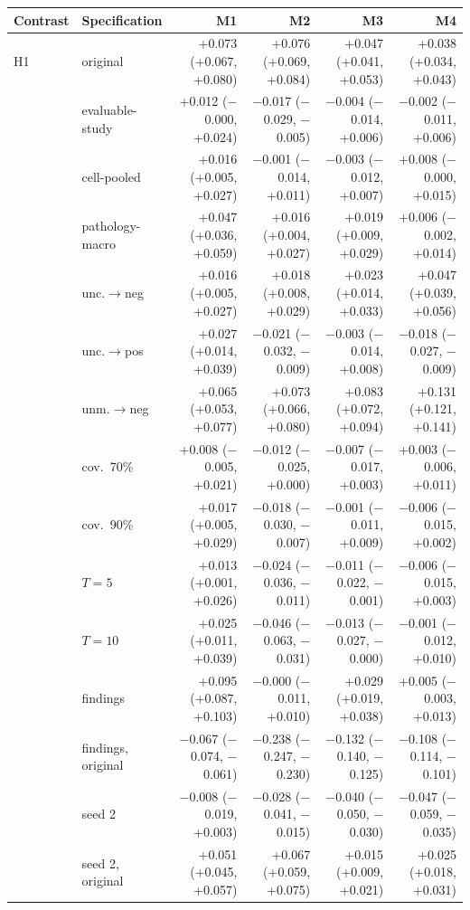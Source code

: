 \begin{longtable}{llrrrr}
\toprule
Contrast & Specification & M1 & M2 & M3 & M4\\
\midrule
\endhead
H1 & original & +0.073 (+0.067, +0.080) & +0.076 (+0.069, +0.084) & +0.047 (+0.041, +0.053) & +0.038 (+0.034, +0.043)\\
 & evaluable-study & +0.012 ($-$0.000, +0.024) & $-$0.017 ($-$0.029, $-$0.005) & $-$0.004 ($-$0.014, +0.006) & $-$0.002 ($-$0.011, +0.006)\\
 & cell-pooled & +0.016 (+0.005, +0.027) & $-$0.001 ($-$0.014, +0.011) & $-$0.003 ($-$0.012, +0.007) & +0.008 ($-$0.000, +0.015)\\
 & pathology-macro & +0.047 (+0.036, +0.059) & +0.016 (+0.004, +0.027) & +0.019 (+0.009, +0.029) & +0.006 ($-$0.002, +0.014)\\
 & unc.$\to$neg & +0.016 (+0.005, +0.027) & +0.018 (+0.008, +0.029) & +0.023 (+0.014, +0.033) & +0.047 (+0.039, +0.056)\\
 & unc.$\to$pos & +0.027 (+0.014, +0.039) & $-$0.021 ($-$0.032, $-$0.009) & $-$0.003 ($-$0.014, +0.008) & $-$0.018 ($-$0.027, $-$0.009)\\
 & unm.$\to$neg & +0.065 (+0.053, +0.077) & +0.073 (+0.066, +0.080) & +0.083 (+0.072, +0.094) & +0.131 (+0.121, +0.141)\\
 & cov.\ 70\% & +0.008 ($-$0.005, +0.021) & $-$0.012 ($-$0.025, +0.000) & $-$0.007 ($-$0.017, +0.003) & +0.003 ($-$0.006, +0.011)\\
 & cov.\ 90\% & +0.017 (+0.005, +0.029) & $-$0.018 ($-$0.030, $-$0.007) & $-$0.001 ($-$0.011, +0.009) & $-$0.006 ($-$0.015, +0.002)\\
 & $T=5$ & +0.013 (+0.001, +0.026) & $-$0.024 ($-$0.036, $-$0.011) & $-$0.011 ($-$0.022, $-$0.001) & $-$0.006 ($-$0.015, +0.003)\\
 & $T=10$ & +0.025 (+0.011, +0.039) & $-$0.046 ($-$0.063, $-$0.031) & $-$0.013 ($-$0.027, $-$0.000) & $-$0.001 ($-$0.012, +0.010)\\
 & findings & +0.095 (+0.087, +0.103) & $-$0.000 ($-$0.011, +0.010) & +0.029 (+0.019, +0.038) & +0.005 ($-$0.003, +0.013)\\
 & findings, original & $-$0.067 ($-$0.074, $-$0.061) & $-$0.238 ($-$0.247, $-$0.230) & $-$0.132 ($-$0.140, $-$0.125) & $-$0.108 ($-$0.114, $-$0.101)\\
 & seed 2 & $-$0.008 ($-$0.019, +0.003) & $-$0.028 ($-$0.041, $-$0.015) & $-$0.040 ($-$0.050, $-$0.030) & $-$0.047 ($-$0.059, $-$0.035)\\
 & seed 2, original & +0.051 (+0.045, +0.057) & +0.067 (+0.059, +0.075) & +0.015 (+0.009, +0.021) & +0.025 (+0.018, +0.031)\\

\end{longtable}
